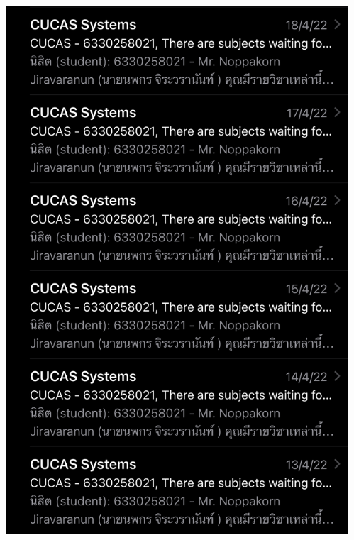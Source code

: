 \documentclass[aspectratio=169]{beamer}
\begin{document}
\begin{frame}
\begin{columns}
\begin{column}{0.3\textwidth}
        \end{column}
        \begin{column}{0.4\textwidth}
            \centering
            \includegraphics[scale=0.1]{cucas_email_cropped.png}
        \end{column}
    \end{columns}
\end{frame}
\end{document}
